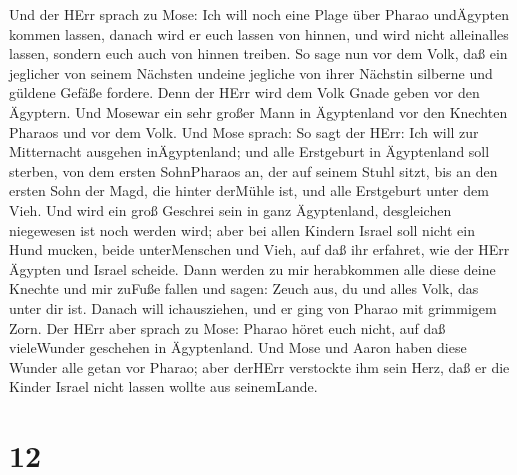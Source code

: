  Und der HErr sprach zu Mose: Ich will noch eine Plage über
Pharao undÄgypten kommen lassen, danach wird er euch lassen von hinnen,
und wird nicht alleinalles lassen, sondern euch auch von hinnen treiben.
 So sage nun vor dem Volk, daß ein jeglicher von seinem
Nächsten undeine jegliche von ihrer Nächstin silberne und güldene Gefäße
fordere.  Denn der HErr wird dem Volk Gnade geben vor den
Ägyptern. Und Mosewar ein sehr großer Mann in Ägyptenland vor den
Knechten Pharaos und vor dem Volk.  Und Mose sprach: So sagt
der HErr: Ich will zur Mitternacht ausgehen inÄgyptenland; 
und alle Erstgeburt in Ägyptenland soll sterben, von dem ersten
SohnPharaos an, der auf seinem Stuhl sitzt, bis an den ersten Sohn der
Magd, die hinter derMühle ist, und alle Erstgeburt unter dem Vieh.
 Und wird ein groß Geschrei sein in ganz Ägyptenland,
desgleichen niegewesen ist noch werden wird;  aber bei allen
Kindern Israel soll nicht ein Hund mucken, beide unterMenschen und Vieh,
auf daß ihr erfahret, wie der HErr Ägypten und Israel scheide.
 Dann werden zu mir herabkommen alle diese deine Knechte und
mir zuFuße fallen und sagen: Zeuch aus, du und alles Volk, das unter dir
ist. Danach will ichausziehen, und er ging von Pharao mit grimmigem
Zorn.  Der HErr aber sprach zu Mose: Pharao höret euch
nicht, auf daß vieleWunder geschehen in Ägyptenland.  Und
Mose und Aaron haben diese Wunder alle getan vor Pharao; aber derHErr
verstockte ihm sein Herz, daß er die Kinder Israel nicht lassen wollte
aus seinemLande.

\hypertarget{section-11}{%
\section{12}\label{section-11}}

